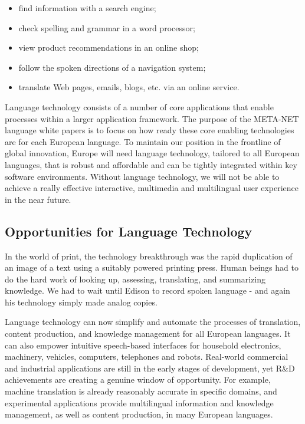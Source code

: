 \begin{multicols}{2}
\begin{itemize}
\item find information with a search engine;
\item check spelling and grammar in a word processor;
\item view product recommendations in an online shop;
\item follow the spoken directions of a navigation system;
\item translate Web pages, emails, blogs, etc. via an online service.
\end{itemize}

Language technology consists of a number of core applications that enable processes within a larger application framework. The purpose of the META-NET language white papers is to focus on how ready these core enabling technologies are for each European language. 
To maintain our position in the frontline of global innovation, Europe will need language technology, tailored to all European languages, that is robust and affordable and can be tightly integrated within key software environments. Without language technology, we will not be able to achieve a really effective interactive, multimedia and multilingual user experience in the near future.

\subsection{Opportunities for Language Technology}

In the world of print, the technology breakthrough was the rapid duplication of an image of a text using a suitably powered printing press. Human beings had to do the hard work of looking up, assessing, translating, and summarizing knowledge. We had to wait until Edison to record spoken language - and again his technology simply made analog copies.

Language technology can now simplify and automate the processes of translation, content production, and knowledge management for all European languages. It can also empower intuitive speech-based interfaces for household electronics, machinery, vehicles, computers, telephones and robots. Real-world commercial and industrial applications are still in the early stages of development, yet R\&D achievements are creating a genuine window of opportunity. For example, machine translation is already reasonably accurate in specific domains, and experimental applications provide multilingual information and knowledge management, as well as content production, in many European languages. 


\end{multicols}
